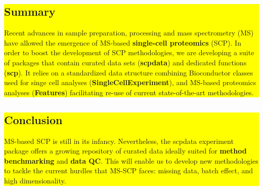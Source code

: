 \documentclass{article}
\newcommand{\hcode}[2][lgray]{{\ttfamily\color{vdgray}\colorbox{#1}{#2}}}
\begin{document}
\noindent
\colorbox{yellow}{
  \noindent
  \begin{minipage}[t]{13.7cm}
  \vspace{.15cm}
    \section*{\huge Summary}
    \large 
    Recent advances in sample preparation, processing and mass spectrometry (MS) have allowed the emergence of MS-based \textbf{single-cell proteomics} (SCP). In order to boost the development of SCP methodologies, we are developing a suite of packages that contain curated data sets (\textbf{\hcode[yellow]{scpdata}}) and dedicated functions (\textbf{\hcode[yellow]{scp}}). It relies on a standardized data structure combining Bioconductor classes used for singe cell analyses (\textbf{\hcode[yellow]{SingleCellExperiment}}), and MS-based proteomics analyses (\textbf{\hcode[yellow]{Features}}) facilitating re-use of current state-of-the-art methodologies.
    \vspace{0.1cm}
  \end{minipage}
}
\hspace{0.37cm}
\noindent
\colorbox{yellow}{
  \begin{minipage}[t]{13.6cm}
    \vspace{.2cm}
    \section*{\huge Conclusion}
    \vspace{0.35cm}
    \large
    MS-based SCP is still in its infancy. Nevertheless, the \hcode[yellow]{scpdata} experiment package offers a growing repository of curated data ideally suited for \textbf{method benchmarking} and \textbf{data QC}. This will enable us to develop new methodologies to tackle the current hurdles that MS-SCP faces: missing data, batch effect, and high dimensionality. 
    \vspace{0.57cm}
 \end{minipage}
}
\vspace{-1cm}
\end{document}
